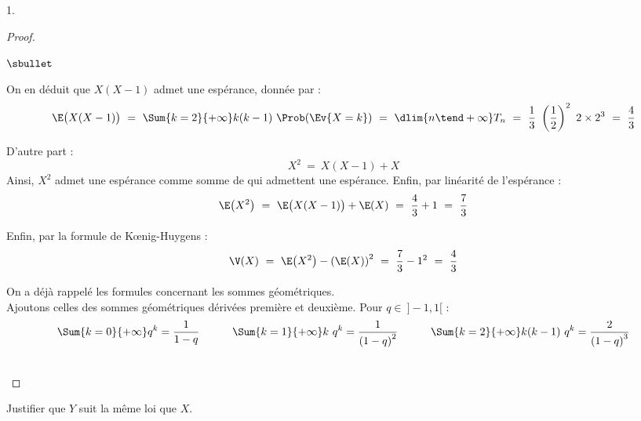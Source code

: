 \documentclass[11pt]{article}%
\begin{document}
\begin{noliste}{1.}
\begin{proof}
\begin{noliste}{$\sbullet$}
    \item On en déduit que $X(X-1)$ admet une espérance, donnée par :
      \[
      \E\big( X(X-1) \big) \ = \ \Sum{k=2}{+\infty} k(k-1) \
      \Prob(\Ev{X = k}) \ = \ \dlim{n \tend +\infty} T_n \ = \
      \dfrac{1}{3} \ \left(\dfrac{1}{2} \right)^2 \ 2 \times 2^3 \ = \
      \dfrac{4}{3} 
      \]
      \conc{$\E\big( X(X-1) \big) = \dfrac{4}{3}$}

    \item D'autre part :
      \[
      X^2 \ = \ X(X-1) + X
      \]
      Ainsi, $X^2$ admet une espérance comme somme de \var qui
      admettent une espérance. Enfin, par linéarité de l'espérance :
      \[
      \E\big( X^2 \big) \ = \ \E\big( X(X-1) \big) + \E(X) \ = \
      \dfrac{4}{3} + 1 \ = \ \dfrac{7}{3}
      \]

    \item Enfin, par la formule de K\oe{}nig-Huygens :
      \[
      \V(X) \ = \ \E\big( X^2 \big) - \left( \E(X) \right)^2 \ = \
      \dfrac{7}{3} - 1^2 \ = \ \dfrac{4}{3}
      \]
      \conc{$\V(X) \ = \ \dfrac{4}{3}$}
    \end{noliste}
    \begin{remark}%
      On a déjà rappelé les formules concernant les sommes
      géométriques.\\
      Ajoutons celles des sommes géométriques dérivées première et
      deuxième. Pour $q \in \ ]-1, 1[$ :
      \[
      \Sum{k = 0}{+\infty} q^k = \dfrac{1}{1-q}%
      \quad\qquad \Sum{k = 1}{+\infty} k \ q^k = \dfrac{1}{\left(
          1-q \right)^2}%
      \quad\qquad \Sum{k = 2}{+\infty} k(k-1) \ q^k =
      \dfrac{2}{\left( 1-q \right)^3}%
      \]      
    \end{remark}~\\[-1.3cm]
  \end{proof}

\item Justifier que $Y$ suit la même loi que $X$.


\end{noliste}
\end{document}
